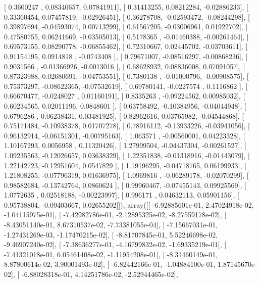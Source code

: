 \documentclass{article}
\begin{document}
       [ 0.3600247 ,  0.08340657,  0.07841911],
       [ 0.31413255,  0.08212284, -0.02886233],
       [ 0.33360454,  0.07457819, -0.02926451],
       [ 0.36278708, -0.02593472, -0.08244298],
       [ 0.39897694, -0.04593074,  0.00713299],
       [ 0.61567205, -0.03006961,  0.01922702],
       [ 0.47580755,  0.06241669, -0.03505013],
       [ 0.5178365 , -0.01460388, -0.00261464],
       [ 0.69573155,  0.08290778, -0.06855462],
       [ 0.72310667,  0.02445702, -0.03703611],
       [ 0.91154195,  0.0914818 , -0.0743408 ],
       [ 0.79671007, -0.08516297, -0.00868236],
       [ 0.9031566 , -0.01366926, -0.0013016 ],
       [ 0.68628932,  0.08836008,  0.07091057],
       [ 0.87323988,  0.02680691, -0.04753551],
       [ 0.7380138 , -0.01000796, -0.00908575],
       [ 0.75373297, -0.08622365, -0.07532619],
       [ 0.69780141, -0.0227574 ,  0.1116862 ],
       [ 0.66670477, -0.0248027 ,  0.01160191],
       [ 0.8335263 , -0.09224562,  0.00985032],
       [ 0.60234565,  0.02011196,  0.0848601 ],
       [ 0.63758492, -0.10384956, -0.04044948],
       [ 0.6796286 ,  0.06238431,  0.03481925],
       [ 0.82962616,  0.03765982, -0.04544868],
       [ 0.75171484, -0.10938378,  0.01707278],
       [ 0.78916112, -0.13933226, -0.03941056],
       [ 0.96132914, -0.06151301, -0.00795163],
       [ 1.063571  , -0.00560001,  0.04223328],
       [ 1.10167293,  0.0056958 ,  0.11320426],
       [ 1.27999504, -0.04437304, -0.00261527],
       [ 1.09235563, -0.12026657,  0.03638329],
       [ 1.22351838, -0.01318916, -0.01443079],
       [ 1.22142723, -0.12951604,  0.0547829 ],
       [ 1.19196295, -0.04718765,  0.06199933],
       [ 1.21808255, -0.07796319,  0.01636975],
       [ 1.0969816 , -0.06289178, -0.02070299],
       [ 0.98582684, -0.13742764,  0.0860624 ],
       [ 0.99960467, -0.07455143,  0.09925569],
       [ 1.0772635 ,  0.02518188, -0.00223997],
       [ 0.996171  ,  0.04632113,  0.05901156],
       [ 0.95738804, -0.09403667,  0.02655202]]), array([[ -6.92885601e-01,   2.47024918e-02,  -1.04115975e-01],
       [ -7.42982786e-01,  -2.12895325e-02,  -8.27559178e-02],
       [ -8.43051140e-01,   8.67310537e-02,  -7.73381055e-04],
       [ -7.15667031e-01,  -1.27431269e-03,  -1.17470215e-02],
       [ -8.81707845e-01,   5.52246698e-02,  -9.46907240e-02],
       [ -7.38636277e-01,  -4.16799832e-02,  -1.69335219e-01],
       [ -7.41321018e-01,   6.05461408e-02,  -1.11954208e-01],
       [ -8.31460149e-01,   8.87800614e-02,   3.90001493e-02],
       [ -6.82442166e-01,  -1.04884100e-01,   1.87145670e-02],
       [ -6.88028318e-01,   4.14251786e-02,  -2.52944465e-02],
\end{document}
